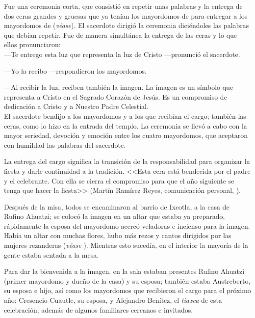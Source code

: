 \documentclass[14pt,letterpaper,twoside]{extbook} %
\begin{document}
Fue una ceremonia corta, que consistió en repetir unas palabras y la entrega de dos ceras grandes y gruesas que ya tenían los mayordomos de  para entregar a los mayordomos de  (\emph{véase}). El sacerdote dirigió la ceremonia diciéndoles las palabras que debían repetir. Fue de manera simultánea la entrega de las ceras y lo que ellos pronunciaron:\\

---Te entrego esta luz que representa la luz de Cristo ---pronunció el sacerdote.

---Yo la recibo ---respondieron los mayordomos.

---Al recibir la luz, reciben también la imagen. La imagen es un símbolo que representa a Cristo en el Sagrado Corazón de Jesús. Es un compromiso de dedicación a Cristo y a Nuestro Padre Celestial.\\

\noindent El sacerdote bendijo a los mayordomos y a los que recibían el cargo; también las ceras, como lo hizo en la entrada del templo. La ceremonia se llevó a cabo con la mayor seriedad, devoción y emoción entre los cuatro mayordomos, que aceptaron con humildad las palabras del sacerdote.

La entrega del cargo significa la transición de la responsabilidad para organizar la fiesta y darle continuidad a la tradición. <<Esta cera está bendecida por el padre y el celebrante. Con ella se cierra el compromiso para que el año siguiente se tenga que hacer la fiesta>> (Martín
Ramírez Reyes, comunicación personal, ).

Después de la misa, todos se encaminaron al barrio de Ixcotla, a la casa de Rufino Ahuatzi; se colocó la imagen en un altar que estaba ya preparado, rápidamente la esposa del mayordomo acercó veladoras e incienso para la imagen. Había un altar con muchas flores, hubo más rezos y cantos dirigidos por las mujeres rezanderas (\emph{véase} ). Mientras esto sucedía, en el interior la mayoría de la gente estaba sentada a la mesa.

Para dar la bienvenida a la imagen, en la sala estaban presentes Rufino Ahuatzi (primer mayordomo y dueño de la casa) y su esposa; también estaba Austreberto, su esposa e hijo, así como los mayordomos que recibieron el cargo para el próximo año: Cresencio Cuautle, su esposa, y Alejandro Benítez, el \textit{tiaxca} de esta celebración; además de algunos familiares cercanos e invitados.
\end{document}
